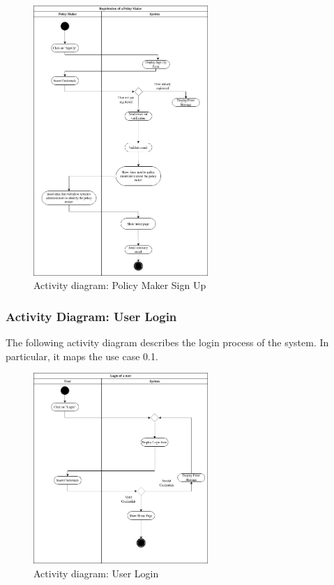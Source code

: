 \documentclass[10pt]{report}
\begin{document}
\begin{figure}[H]
    \centering
    \includegraphics[width=250px]{ActivityDiagrams/PolicyMakerSignUp.jpg}
    \caption{Activity diagram: Policy Maker Sign Up}
\end{figure}
\subsubsection{Activity Diagram: User Login}
The following activity diagram describes the login process of the system. In particular, it maps the use case 0.1.
\begin{figure}[H]
    \centering
    \includegraphics[width=250px]{ActivityDiagrams/UserLogin.jpg}
    \caption{Activity diagram: User Login}
\end{figure}
\end{document}
